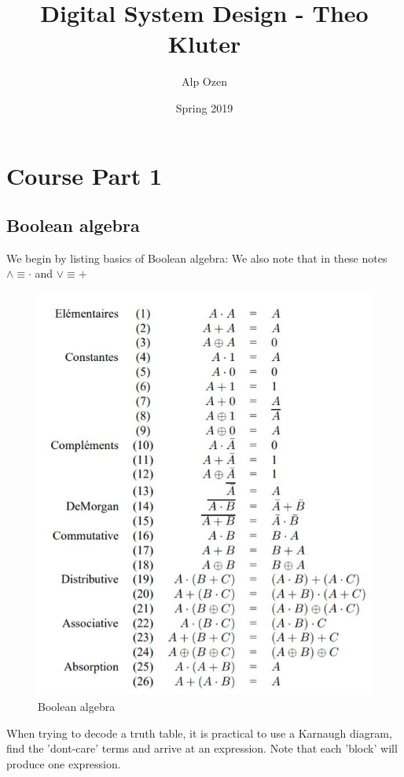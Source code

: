 \documentclass[titlepage]{article}
\title{\textbf{Digital System Design - Theo Kluter}}
\author{Alp Ozen}
\date{Spring 2019}
\begin{document}
\maketitle
\tableofcontents
\clearpage

\section{Course Part 1}

\subsection{Boolean algebra}

We begin by listing basics of Boolean algebra:
We also note that in these notes $\land \equiv \cdot$ and $\lor \equiv +$

\begin{figure}[H]
    \centering
    \includegraphics{src/bool.JPG}
    \caption{Boolean algebra}
    \label{Boolean algebra}
\end{figure}

When trying to decode a truth table, it is practical to use a Karnaugh diagram, find the 'dont-care' terms and arrive at an expression. Note that each 'block' will produce one expression. 
\end{document}

